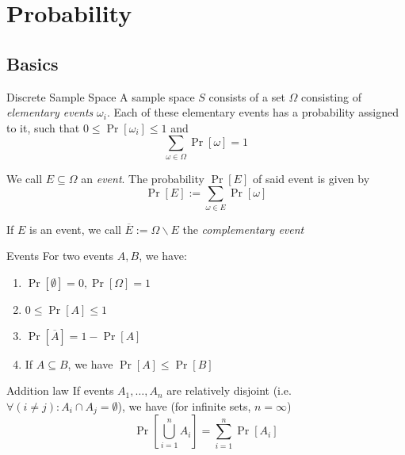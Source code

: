 \newsection
\section{Probability}

\subsection{Basics}

\begin{definition}[]{Discrete Sample Space}
    A sample space $S$ consists of a set $\Omega$ consisting of \textit{elementary events} $\omega_i$. Each of these elementary events has a probability assigned to it, such that $0 \leq \Pr[\omega_i] \leq 1$ and
    \[
        \sum_{\omega \in \Omega} \Pr[\omega] = 1
    \]

    We call $E \subseteq \Omega$ an \textit{event}. The probability $\Pr[E]$ of said event is given by
    \[
        \Pr[E] := \sum_{\omega \in E} \Pr[\omega]
    \]

    If $E$ is an event, we call $\overline{E} := \Omega \backslash E$ the \textit{complementary event}
\end{definition}

\begin{lemma}[]{Events}
    For two events $A, B$, we have:
    \begin{multicols}{2}
        \begin{enumerate}
            \item $\Pr[\emptyset] = 0, \Pr[\Omega] = 1$
            \item $0 \leq \Pr[A] \leq 1$
            \item $\Pr[\overline{A}] = 1 - \Pr[A]$
            \item If $A \subseteq B$, we have $\Pr[A] \leq \Pr[B]$
        \end{enumerate}
    \end{multicols}
\end{lemma}

\begin{theorem}[]{Addition law}
    If events $A_1, \ldots, A_n$ are relatively disjoint (i.e. $\forall (i \neq j) : A_i \cap A_j = \emptyset$), we have (for infinite sets, $n = \infty$)
    \[
        \Pr\left[ \bigcup_{i = 1}^{n} A_i \right] = \sum_{i = 1}^{n} \Pr[A_i]
    \]
\end{theorem}

